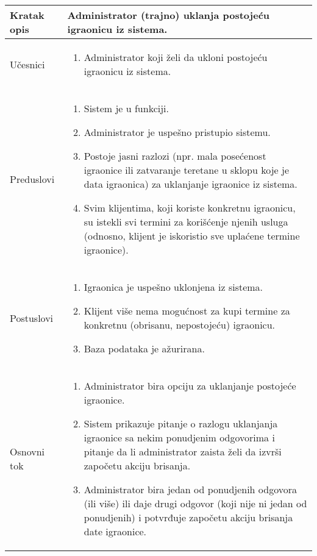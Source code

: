 \documentclass[../main.tex]{subfiles}
\begin{document}
\begin{longtable}{| p{} | p{} |} 

\hline
    Kratak opis &  Administrator (trajno) uklanja postojeću igraonicu iz sistema. \\ 
\hline    
    Učesnici & 
    	\begin{enumerate}
        \item Administrator koji želi da ukloni postojeću igraonicu iz sistema.
     \end{enumerate}\\
\hline
   Preduslovi & \begin{enumerate}
       \item Sistem je u funkciji.
       \item Administrator je uspešno pristupio sistemu.
       \item Postoje jasni razlozi (npr. mala posećenost igraonice ili zatvaranje teretane u sklopu koje je data igraonica) za uklanjanje igraonice iz sistema.
       \item Svim klijentima, koji koriste konkretnu igraonicu, su istekli svi termini za korišćenje njenih usluga (odnosno, klijent je iskoristio sve uplaćene termine igraonice).
   \end{enumerate}\\
\hline  
    Postuslovi & \begin{enumerate}
        \item Igraonica je uspešno uklonjena iz sistema.
        \item Klijent više nema mogućnost za kupi termine za konkretnu (obrisanu, nepostojeću) igraonicu.
        \item Baza podataka je ažurirana.
    \end{enumerate}\\
\hline
    Osnovni tok & \begin{enumerate}
        \item Administrator bira opciju za uklanjanje postojeće igraonice.
        \item Sistem prikazuje pitanje o razlogu uklanjanja igraonice sa nekim ponudjenim odgovorima i pitanje da li administrator zaista želi da izvrši započetu akciju brisanja.
        \item Administrator bira jedan od ponudjenih odgovora (ili više) ili daje drugi odgovor (koji nije ni jedan od ponudjenih) i potvrđuje započetu akciju brisanja date igraonice. %

\end{enumerate}
\end{longtable}
\end{document}
